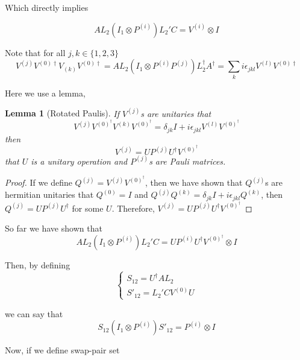 \documentclass{report}
\newtheorem{lemma}{Lemma}
\begin{document}
Which directly implies

\begin{equation}
  AL_2 (I_1 \otimes P^{(i)}) L_2' C = V^{(i)} \otimes I
\end{equation}

Note that for all $j, k \in \{1, 2, 3\}$
\begin{equation}
  V^{(j)} V^{(0)\dagger} V_{(k)} V^{(0)\dagger} = AL_2 (I_1 \otimes P^{(i)} P^{(j)}) L_2^\dagger A^\dagger = \sum_k i\epsilon_{jkl} V^{(l)}V^{(0)\dagger}
\end{equation}

Here we use a lemma,
\begin{lemma}[Rotated Paulis]
  If $V^{(j)}$s are unitaries that
  \begin{equation}
    V^{(j)} V^{(0)^\dagger} V^{(k)} V^{(0)^\dagger} = \delta_{jk}I + i\epsilon_{jkl} V^{(l)} V^{(0)^\dagger}
  \end{equation}
  then 
  \begin{equation}
    V^{(j)} = U P^{(j)} U^\dagger V^{(0)^\dagger}
  \end{equation}
  that $U$ is a unitary operation and $P^{(j)}$s are Pauli matrices.
\end{lemma}
\begin{proof}
  If we define $Q^{(j)} = V^{(j)} V^{(0)^\dagger}$, then we have shown that $Q^{(j)}$s are hermitian unitaries that $Q^{(0)} = I$ and $Q^{(j)}Q^{(k)} = \delta_{jk}I + i\epsilon_{jkl} Q^{(k)}$, then $Q^{(j)} = U P^{(j)} U^\dagger$ for some $U$.
  Therefore, $V^{(j)} = U P^{(j)} U^\dagger V^{(0)^\dagger}$
\end{proof}


So far we have shown that
\begin{equation}
  AL_2 (I_1 \otimes P^{(i)}) L_2' C = U P^{(i)} U^\dagger V^{(0)^\dagger} \otimes I
\end{equation}

Then, by defining 
\begin{equation}
  \begin{cases} S_{12} = U^\dagger AL_2 \\
    S'_{12} = L_2' C V^{(0)} U
  \end{cases}
\end{equation}

we can say that
\begin{equation}
  S_{12} (I_1 \otimes P^{(i)}) S'_{12} = P^{(i)} \otimes I
\end{equation}


Now, if we define swap-pair set
\end{document}

